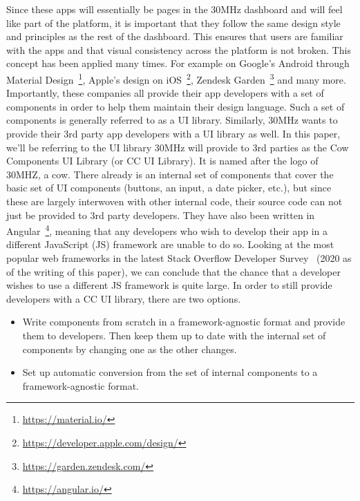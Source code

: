 Since these apps will essentially be pages in the 30MHz dashboard and will feel like part of the platform, it is important that they follow the same design style and principles as the rest of the dashboard. This ensures that users are familiar with the apps and that visual consistency across the platform is not broken. This concept has been applied many times. For example on Google's Android through Material Design~\footnote{\url{https://material.io/}}, Apple's design on iOS~\footnote{\url{https://developer.apple.com/design/}}, Zendesk Garden~\footnote{\url{https://garden.zendesk.com/}} and many more. Importantly, these companies all provide their app developers with a set of components in order to help them maintain their design language. Such a set of components is generally referred to as a UI library. Similarly, 30MHz wants to provide their 3rd party app developers with a UI library as well. In this paper, we'll be referring to the UI library 30MHz will provide to 3rd parties as the Cow Components UI Library (or CC UI Library). It is named after the logo of 30MHZ, a cow. There already is an internal set of components that cover the basic set of UI components (buttons, an input, a date picker, etc.), but since these are largely interwoven with other internal code, their source code can not just be provided to 3rd party developers. They have also been written in Angular~\footnote{\url{https://angular.io/}}, meaning that any developers who wish to develop their app in a different JavaScript (JS) framework are unable to do so. Looking at the most popular web frameworks in the latest Stack Overflow Developer Survey~\cite{stack-overflow-dev-survey} (2020 as of the writing of this paper), we can conclude that the chance that a developer wishes to use a different JS framework is quite large. In order to still provide developers with a CC UI library, there are two options.

\begin{itemize}
	\item Write components from scratch in a framework-agnostic format and provide them to developers. Then keep them up to date with the internal set of components by changing one as the other changes.
	\item Set up automatic conversion from the set of internal components to a framework-agnostic format.
\end{itemize}

